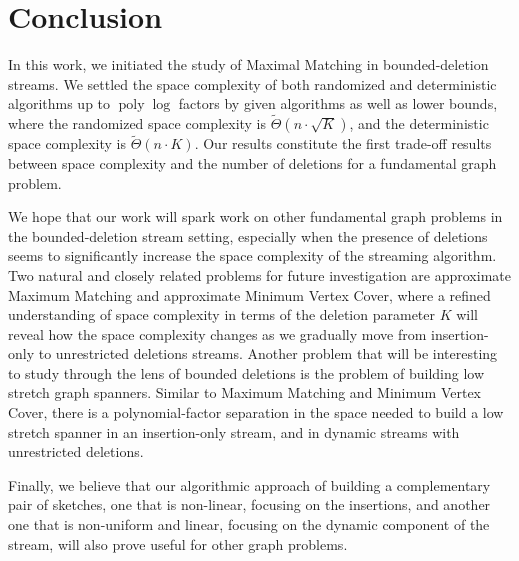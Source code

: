 \documentclass[11pt,a4paper]{article}
\DeclareMathOperator{\poly}{poly}
\begin{document}
\section{Conclusion}\label{sec:conclusion}
In this work, we initiated the study of \textsf{Maximal Matching} in  bounded-deletion streams. We settled the space complexity of both randomized and deterministic algorithms up to $\poly \log$ factors by given algorithms as well as lower bounds, where the randomized space complexity is $\tilde{\Theta}(n \cdot \sqrt{K})$, and the deterministic space complexity is $\tilde{\Theta}(n \cdot K)$. Our results constitute the first trade-off results between space complexity and the number of deletions for a fundamental graph problem. %

We hope that our work will spark work on other fundamental graph problems in the bounded-deletion stream setting, especially when the presence of deletions seems to significantly increase the space complexity of the streaming algorithm. Two natural and closely related problems for future investigation are approximate \textsf{Maximum Matching} and approximate \textsf{Minimum Vertex Cover}, where a refined understanding of space complexity in terms of the deletion parameter $K$ will reveal how the space complexity changes as we gradually move from insertion-only to unrestricted deletions streams. Another problem that will be interesting to study through the lens of bounded deletions is the problem of building low stretch graph spanners. Similar to \textsf{Maximum Matching} and \textsf{Minimum Vertex Cover}, there is a polynomial-factor separation in the space needed to build a low stretch spanner in an insertion-only stream, and in dynamic streams with unrestricted deletions.



Finally, we believe that our algorithmic approach of building a complementary pair of sketches, one that is  non-linear, focusing on the insertions, and another one that is non-uniform and linear, focusing on the dynamic component of the stream, will also prove useful for other graph problems.
\end{document}
